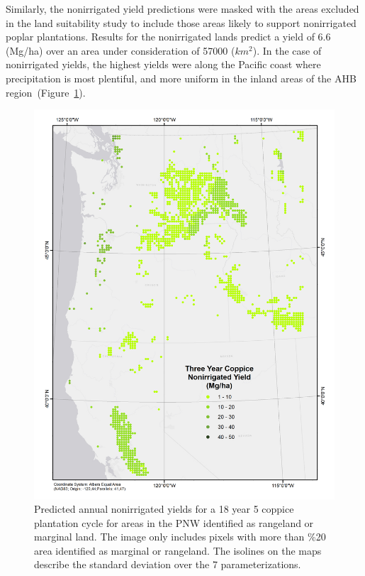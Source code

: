 \documentclass[preprint,12pt]{elsarticle}
\begin{document}
Similarly, the nonirrigated yield predictions were masked with the
areas excluded in the land suitability study to include those areas
likely to support nonirrigated poplar plantations.  Results for the
nonirrigated lands predict a yield of 6.6 (Mg/ha) over an area under
consideration of 57000 ($km^2$).  In the case of nonirrigated yields, the
highest yields were along the Pacific coast where precipitation is
most plentiful, and more uniform in the inland areas of the \ac{AHB}
region~(Figure~\ref{fig:nonirrigated_yield}).

\begin{figure}[hp]
  \centering
  \includegraphics[width=1.0\linewidth]{nonirrigated_yield}
  \caption{Predicted annual nonirrigated yields for a 18 year 5 coppice plantation cycle for areas in the \ac{PNW} identified as rangeland or marginal land.  The image only includes pixels with more than \%20 area identified as marginal or rangeland.  The isolines on the maps describe the standard deviation over the 7 parameterizations.}
  \label{fig:nonirrigated_yield}
\end{figure}
\end{document}
